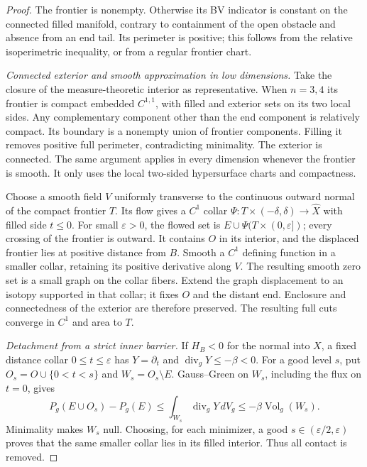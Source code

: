 \begin{proof}
The frontier is nonempty. Otherwise its BV indicator is constant
on the connected filled manifold, contrary to containment of the
open obstacle and absence from an end tail. Its perimeter is positive;
this follows from the relative isoperimetric inequality, or from a
regular frontier chart.

\emph{Connected exterior and smooth approximation in low dimensions.}
Take the closure of the measure-theoretic interior as representative.
When $n=3,4$ its frontier is compact embedded $C^{1,1}$, with filled
and exterior sets on its two local sides. Any complementary component
other than the end component is relatively compact. Its boundary is
a nonempty union of frontier components. Filling it removes positive
full perimeter, contradicting minimality. The exterior is connected. The same argument applies in every
dimension whenever the frontier is smooth. It only uses the local
two-sided hypersurface charts and compactness.

Choose a smooth field $V$ uniformly transverse to the continuous
outward normal of the compact frontier $T$. Its flow gives a $C^1$
collar $\Psi:T\times(-\delta,\delta)\to\widehat X$ with filled side
$t\le0$. For small $\varepsilon>0$, the flowed set is
$E\cup\Psi(T\times(0,\varepsilon])$; every crossing of the frontier
is outward. It contains $O$ in its interior, and the displaced
frontier lies at positive distance from $B$. Smooth a $C^1$ defining
function in a smaller collar, retaining its positive derivative
along $V$. The resulting smooth zero set is a small graph on the
collar fibers. Extend the graph displacement to an isotopy supported
in that collar; it fixes $O$ and the distant end. Enclosure and
connectedness of the exterior are therefore preserved. The resulting
full cuts converge in $C^1$ and area to $T$.

\emph{Detachment from a strict inner barrier.}
If $H_B<0$ for the normal into $X$, a fixed distance collar
$0\le t\le\varepsilon$ has $Y=\partial_t$ and
$\operatorname{div}_gY\le-\beta<0$. For a good level $s$, put
$O_s=O\cup\{0<t<s\}$ and $W_s=O_s\setminus E$.
Gauss--Green on $W_s$, including the flux on $t=0$, gives
\begin{equation}\label{q:geometry:detachment}
 P_g(E\cup O_s)-P_g(E)
 \le\int_{W_s}\operatorname{div}_gY\,dV_g
 \le-\beta\operatorname{Vol}_g(W_s).
\end{equation}
Minimality makes $W_s$ null. Choosing, for each minimizer, a good
$s\in(\varepsilon/2,\varepsilon)$ proves that the same smaller
collar lies in its filled interior. Thus all contact is removed.


\end{proof}
